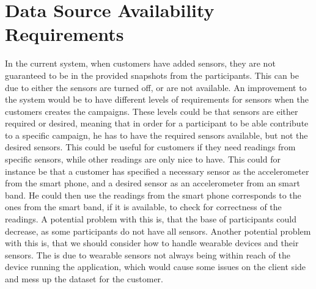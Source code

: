 
\section{Data Source Availability Requirements}

In the current system, when customers have added sensors, they are not guaranteed to be in the provided snapshots from the participants. This can be due to either the sensors are turned off, or are not available. An improvement to the system would be to have different levels of requirements for sensors when the customers creates the campaigns. These levels could be that sensors are either required or desired, meaning that in order for a participant to be able contribute to a specific campaign, he has to have the required sensors available, but not the desired sensors. This could be useful for customers if they need readings from specific sensors, while other readings are only nice to have. This could for instance be that a customer has specified a necessary sensor as the accelerometer from the smart phone, and a desired sensor as an accelerometer from an smart band. He could then use the readings from the smart phone corresponds to the ones from the smart band, if it is available, to check for correctness of the readings. A potential problem with this is, that the base of participants could decrease, as some participants do not have all sensors. Another potential problem with this is, that we should consider how to handle wearable devices and their sensors. The is due to wearable sensors not always being within reach of the device running the application, which would cause some issues on the client side and mess up the dataset for the customer.

